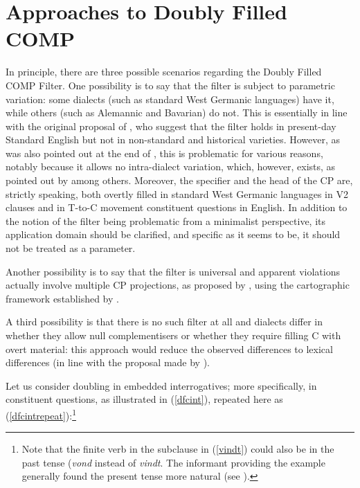\section{Approaches to Doubly Filled COMP} \label{sec:3approaches}
In principle, there are three possible scenarios regarding the Doubly Filled COMP Filter. One possibility is to say that the filter is subject to parametric variation: some dialects (such as standard West Germanic languages) have it, while others (such as Alemannic and Bavarian) do not. This is essentially in line with the original proposal of \citet{chomskylasnik1977}, who suggest that the filter holds in present-day Standard English but not in non-standard and historical varieties. However, as was also pointed out at the end of , this is problematic for various reasons, notably because it allows no intra-dialect variation, which, however, exists, as pointed out by \citet{bayerbrandner2008} among others. Moreover, the specifier and the head of the CP are, strictly speaking, both overtly filled in standard West Germanic languages in V2 clauses and in T-to-C movement constituent questions in English. In addition to the notion of the filter being problematic from a minimalist perspective, its application domain should be clarified, and specific as it seems to be, it should not be treated as a parameter. 

Another possibility is to say that the filter is universal and apparent violations actually involve multiple CP projections, as proposed by \citet{baltin2010}, using the cartographic framework established by \citet{rizzi1997}.

A third possibility is that there is no such filter at all and dialects differ in whether they allow null complementisers or whether they require filling C with overt material: this approach would reduce the observed differences to lexical differences (in line with the proposal made by \citealt{borer1984}).

Let us consider doubling in embedded interrogatives; more specifically, in constituent questions, as illustrated in (\ref{dfcint}), repeated here as (\ref{dfcintrepeat}):\footnote{Note that the finite verb in the subclause in (\ref{vindt}) could also be in the past tense (\textit{vond} instead of \textit{vindt}. The informant providing the example generally found the present tense more natural (see \citealt[30]{bacskaiatkaribaudisch2018}).}

\ea \label{dfcintrepeat}
\z
\z


